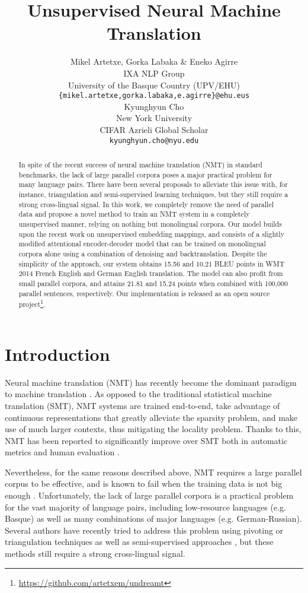 \documentclass{article} \usepackage{iclr2018_conference,times}
\title{Unsupervised Neural Machine Translation}
\author{Mikel Artetxe, Gorka Labaka \& Eneko Agirre \\
IXA NLP Group\\
University of the Basque Country (UPV/EHU) \\
\texttt{\{mikel.artetxe,gorka.labaka,e.agirre\}@ehu.eus} \\
\And
Kyunghyun Cho \\
New York University \\
CIFAR Azrieli Global Scholar \\
\texttt{kyunghyun.cho@nyu.edu}
}
\begin{document}
\maketitle

\begin{abstract}
In spite of the recent success of neural machine translation (NMT) in standard benchmarks, the lack of large parallel corpora poses a major practical problem for many language pairs. There have been several proposals to alleviate this issue with, for instance, triangulation and semi-supervised learning techniques, but they still require a strong cross-lingual signal. In this work, we completely remove the need of parallel data and propose a novel method to train an NMT system in a completely unsupervised manner, relying on nothing but monolingual corpora. Our model builds upon the recent work on unsupervised embedding mappings, and consists of a slightly modified attentional encoder-decoder model that can be trained on monolingual corpora alone using a combination of denoising and backtranslation. Despite the simplicity of the approach, our system obtains 15.56 and 10.21 BLEU points in WMT 2014 French  English and German  English translation. The model can also profit from small parallel corpora, and attains 21.81 and 15.24 points when combined with 100,000 parallel sentences, respectively. Our implementation is released as an open source project\footnote{\url{https://github.com/artetxem/undreamt}}.
\end{abstract}

\section{Introduction}

Neural machine translation (NMT) has recently become the dominant paradigm to machine translation \citep{bahdanau2014neural,sutskever2014sequence}. As opposed to the traditional statistical machine translation (SMT), NMT systems are trained end-to-end, take advantage of continuous representations that greatly alleviate the sparsity problem, and make use of much larger contexts, thus mitigating the locality problem. Thanks to this, NMT has been reported to significantly improve over SMT both in automatic metrics and human evaluation \citep{wu2016google}.

Nevertheless, for the same reasons described above, NMT requires a large parallel corpus to be effective, and is known to fail when the training data is not big enough \citep{koehn2017six}. Unfortunately, the lack of large parallel corpora is a practical problem for the vast majority of language pairs, including low-resource languages (e.g. Basque) as well as many combinations of major languages (e.g. German-Russian). Several authors have recently tried to address this problem using pivoting or triangulation techniques \citep{che2017teacher} as well as semi-supervised approaches \citep{he2016dual}, but these methods still require a strong cross-lingual signal.
\end{document}
